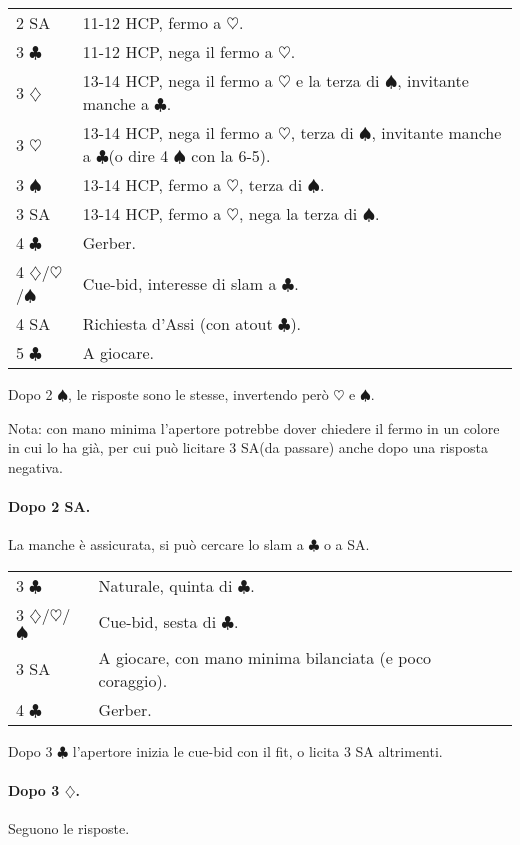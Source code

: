 \documentclass[a4paper,10pt]{article}
\renewcommand{\c}{$\clubsuit$\xspace}
\renewcommand{\d}{$\diamondsuit$\xspace}
\newcommand{\h}{$\heartsuit$\xspace}
\newcommand{\s}{$\spadesuit$\xspace}
\newcommand{\sa}{SA\xspace}
\newcommand{\smallspace}{\vskip0.3cm}
\newenvironment{twocol}
  {\smallspace\noindent\begin{tabular}{l p{0.78\textwidth}}}
  {\end{tabular}\smallspace}
\begin{document}
\begin{twocol}
	2 \sa & 11-12 HCP, fermo a \h. \\
	3 \c & 11-12 HCP, nega il fermo a \h. \\
	3 \d & 13-14 HCP, nega il fermo a \h e la terza di \s, invitante manche a \c. \\
	3 \h & 13-14 HCP, nega il fermo a \h, terza di \s, invitante manche a \c (o dire 4 \s con la 6-5). \\
	3 \s & 13-14 HCP, fermo a \h, terza di \s. \\
	3 \sa & 13-14 HCP, fermo a \h, nega la terza di \s. \\
	4 \c & Gerber. \\
	4 \d/\h/\s & Cue-bid, interesse di slam a \c. \\
	4 \sa & Richiesta d'Assi (con atout \c). \\
	5 \c & A giocare. \\
\end{twocol}

Dopo 2 \s, le risposte sono le stesse, invertendo però \h e \s.

Nota: con mano minima l'apertore potrebbe dover chiedere il fermo in un colore in cui lo ha già, per cui può licitare 3 \sa (da passare) anche dopo una risposta negativa.

\paragraph{Dopo 2 \sa.} La manche è assicurata, si può cercare lo slam a \c o a \sa.

\begin{twocol}
	3 \c & Naturale, quinta di \c. \\
	3 \d/\h/\s & Cue-bid, sesta di \c. \\
	3 \sa & A giocare, con mano minima bilanciata (e poco coraggio). \\
	4 \c & Gerber.
\end{twocol}

Dopo 3 \c l'apertore inizia le cue-bid con il fit, o licita 3 \sa altrimenti. %

\paragraph{Dopo 3 \d.} Seguono le risposte.
\end{document}
